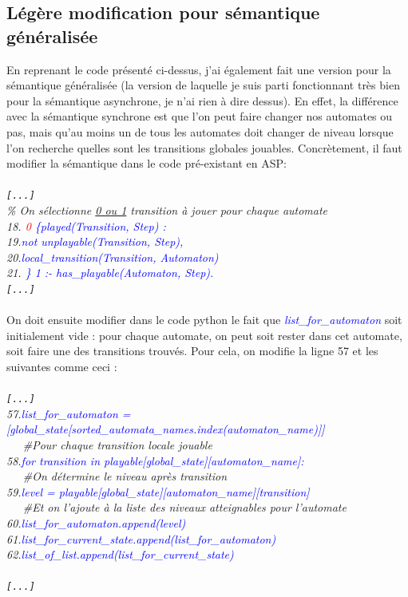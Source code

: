\documentclass[12pt,a4paper]{article}
\begin{document}
\subsection{Légère modification pour sémantique généralisée}
En reprenant le code présenté ci-dessus, j'ai également fait une version pour la sémantique généralisée (la version de laquelle je suis parti fonctionnant très bien pour la sémantique asynchrone, je n'ai rien à dire 
dessus). En effet, la différence avec la sémantique synchrone est que l'on peut faire changer nos automates ou pas, mais qu'au moins un de tous les automates doit changer de niveau lorsque l'on recherche quelles sont les 
transitions globales jouables.
Concrètement, il faut modifier la sémantique dans le code pré-existant en ASP:\\ \\
\emph{
	\verb![...]!\\
	\% On sélectionne \underline{0 ou 1} transition à jouer pour chaque automate\\
	18. \textcolor{blue}{\textcolor{red}{0} \{played(Transition, Step) :}\\
	19.\qquad\qquad\textcolor{blue}{not unplayable(Transition, Step),}\\
	20.\qquad\qquad\textcolor{blue}{local\_transition(Transition, Automaton)}\\
	21. \textcolor{blue}{\} 1 :- has\_playable(Automaton, Step).}\\
	\verb![...]!\\ \\
}
On doit ensuite modifier dans le code python le fait que \emph{\textcolor{blue}{list\_for\_automaton}} soit initialement vide : pour chaque automate, on peut soit rester dans cet automate, soit faire une des transitions trouvés. 
Pour cela, on modifie la ligne 57 et les suivantes comme ceci :\\ \\
\emph{
	\verb![...]!\\
		57.\qquad\qquad\textcolor{blue}{list\_for\_automaton = [global\_state[sorted\_automata\_names.index(automaton\_name)]]}\\
		\textcolor{white}{3ch}\qquad\qquad\#Pour chaque transition locale jouable\\
		58.\qquad\qquad\textcolor{blue}{for transition in playable[global\_state][automaton\_name]:}\\
			\textcolor{white}{3ch}\qquad\qquad\qquad\#On détermine le niveau après transition\\
			59.\qquad\qquad\qquad\textcolor{blue}{level = playable[global\_state][automaton\_name][transition]}\\
			\textcolor{white}{3ch}\qquad\qquad\qquad\#Et on l'ajoute à la liste des niveaux atteignables pour l'automate\\
			60.\qquad\qquad\qquad\textcolor{blue}{list\_for\_automaton.append(level)}\\
		61.\qquad\qquad\textcolor{blue}{list\_for\_current\_state.append(list\_for\_automaton)}\\
	62.\qquad\textcolor{blue}{list\_of\_list.append(list\_for\_current\_state)}\\ \\
	\verb![...]!\\
}
\end{document}
